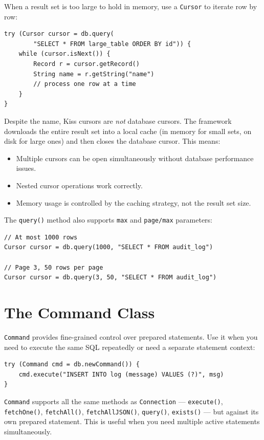 When a result set is too large to hold in memory, use a \texttt{Cursor} to iterate row by row:

\begin{lstlisting}[style=groovy]
try (Cursor cursor = db.query(
        "SELECT * FROM large_table ORDER BY id")) {
    while (cursor.isNext()) {
        Record r = cursor.getRecord()
        String name = r.getString("name")
        // process one row at a time
    }
}
\end{lstlisting}

\noindent
Despite the name, Kiss cursors are \emph{not} database cursors.  The framework downloads the entire result set into a local cache (in memory for small sets, on disk for large ones) and then closes the database cursor.  This means:

\begin{itemize}
  \item Multiple cursors can be open simultaneously without database performance issues.
  \item Nested cursor operations work correctly.
  \item Memory usage is controlled by the caching strategy, not the result set size.
\end{itemize}

\noindent
The \texttt{query()} method also supports \texttt{max} and \texttt{page/max} parameters:

\begin{lstlisting}[style=groovy]
// At most 1000 rows
Cursor cursor = db.query(1000, "SELECT * FROM audit_log")

// Page 3, 50 rows per page
Cursor cursor = db.query(3, 50, "SELECT * FROM audit_log")
\end{lstlisting}

\section{The Command Class}
\label{sec:db-command}

\texttt{Command} provides fine-grained control over prepared statements.  Use it when you need to execute the same SQL repeatedly or need a separate statement context:

\begin{lstlisting}[style=groovy]
try (Command cmd = db.newCommand()) {
    cmd.execute("INSERT INTO log (message) VALUES (?)", msg)
}
\end{lstlisting}

\noindent
\texttt{Command} supports all the same methods as \texttt{Connection} --- \texttt{execute()}, \texttt{fetchOne()}, \texttt{fetchAll()}, \texttt{fetchAllJSON()}, \texttt{query()}, \texttt{exists()} --- but against its own prepared statement.  This is useful when you need multiple active statements simultaneously.

